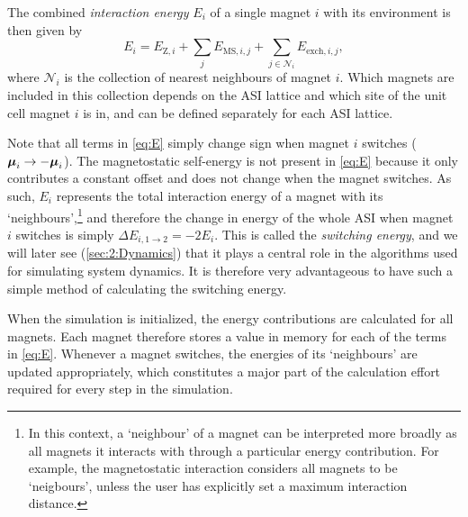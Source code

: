 The combined \textit{interaction energy} $E_i$ of a single magnet $i$ with its environment is then given by
\begin{equation}
	E_i = E_{\mathrm{Z},i} + \sum_j E_{\mathrm{MS},i,j} + \sum_{j \in \mathcal{N}_i} E_{\mathrm{exch},i,j} \mathrm{,}
	\label{eq:E}
\end{equation}
where $\mathcal{N}_i$ is the collection of nearest neighbours of magnet $i$.
Which magnets are included in this collection depends on the ASI lattice and which site of the unit cell magnet $i$ is in, and can be defined separately for each ASI lattice. \\\par
Note that all terms in \cref{eq:E} simply change sign when magnet $i$ switches ($\boldsymbol{\mathbf{\mu}}_i \rightarrow -\boldsymbol{\mathbf{\mu}}_i$).
The magnetostatic self-energy is not present in \cref{eq:E} because it only contributes a constant offset and does not change when the magnet switches.
As such, $E_i$ represents the total interaction energy of a magnet with its `neighbours',\footnote{
	In this context, a `neighbour' of a magnet can be interpreted more broadly as all magnets it interacts with through a particular energy contribution. For example, the magnetostatic interaction considers all magnets to be `neigbours', unless the user has explicitly set a maximum interaction distance.
} and therefore the change in energy of the whole ASI when magnet $i$ switches is simply $\Delta E_{i,1\rightarrow2} = -2 E_i$.
This is called the \textit{switching energy}, and we will later see (\cref{sec:2:Dynamics}) that it plays a central role in the algorithms used for simulating system dynamics.
It is therefore very advantageous to have such a simple method of calculating the switching energy. \par
When the simulation is initialized, the energy contributions are calculated for all magnets.
Each magnet therefore stores a value in memory for each of the terms in \cref{eq:E}.
Whenever a magnet switches, the energies of its `neighbours' are updated appropriately, which constitutes a major part of the calculation effort required for every step in the simulation.

